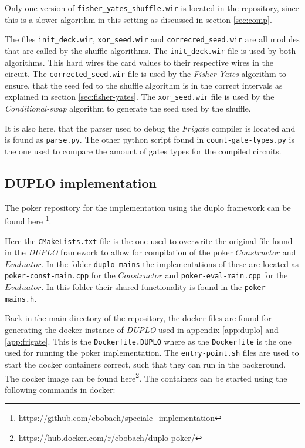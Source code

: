 \documentclass[twoside,11pt,openright]{report}
\newcommand{\FY}{\textit{Fisher-Yates} }
\newcommand{\CS}{\textit{Conditional-swap} }
\newcommand{\DUPLO}{\textit{DUPLO} }
\begin{document}
\begin{appendices}
Only one version of \verb|fisher_yates_shuffle.wir| is located in the repository, since this is a slower algorithm in this setting as discussed in section \ref{sec:comp}.

The files \verb|init_deck.wir|, \verb|xor_seed.wir| and \verb|correcred_seed.wir| are all modules that are called by the shuffle algorithms. The \verb|init_deck.wir| file is used by both algorithms. This hard wires the card values to their respective wires in the circuit. The \verb|corrected_seed.wir| file is used by the \FY algorithm to ensure, that the seed fed to the shuffle algorithm is in the correct intervals as explained in section \ref{sec:fisher-yates}. The \verb|xor_seed.wir| file is used by the \CS algorithm to generate the seed used by the shuffle.

\bigskip

It is also here, that the parser used to debug the $Frigate$ compiler is located and is found as \verb|parse.py|. The other python script found in \verb|count-gate-types.py| is the one used to compare the amount of gates types for the compiled circuits.


\subsection{DUPLO implementation}
\label{app:duplo-impl}
The poker repository for the implementation using the duplo framework can be found here \footnote{\url{https://github.com/cbobach/speciale_implementation}}.

Here the \verb|CMakeLists.txt| file is the one used to overwrite the original file found in the \DUPLO framework to allow for compilation of the poker $Constructor$ and $Evaluator$. In the folder \verb|duplo-mains| the implementations of these are located as \verb|poker-const-main.cpp| for the $Constructor$ and \verb|poker-eval-main.cpp| for the $Evaluator$. In this folder their shared functionality is found in the \verb|poker-mains.h|.

\bigskip

Back in the main directory of the repository, the docker files are found for generating the docker instance of \DUPLO used in appendix \ref{app:duplo} and \ref{app:frigate}. This is the \verb|Dockerfile.DUPLO| where as the \verb|Dockerfile| is the one used for running the poker implementation. The \verb|entry-point.sh| files are used to start the docker containers correct, such that they can run in the background. The docker image can be found here\footnote{\url{https://hub.docker.com/r/cbobach/duplo-poker/}}. The containers can be started using the following commands in docker:


\end{appendices}
\end{document}
